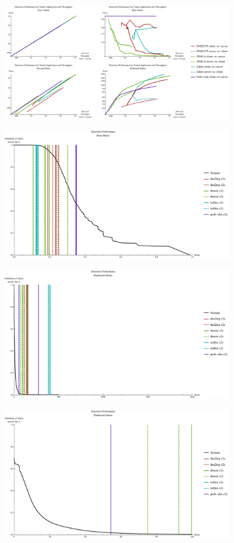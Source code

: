 \documentclass[12pt]{report}
\theoremstyle{remark}
\theoremstyle{definition}
\theoremstyle{definition}
\theoremstyle{definition}
\begin{document}
\clearpage
\begin{figure}
\centering
\includegraphics[width=4in]{figures/mpbtt.pdf}
\end{figure}
\begin{figure}
\centering
\includegraphics[width=4in]{figures/mpbv.pdf}
\end{figure}
\begin{figure}
\centering
\includegraphics[width=4in]{figures/mphv.pdf}
\end{figure}
\begin{figure}
\centering
\includegraphics[width=4in]{figures/mphv-100.pdf}
\end{figure}
\end{document}

